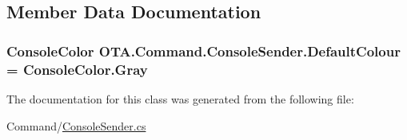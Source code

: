 \subsection{Member Data Documentation}
\hypertarget{class_o_t_a_1_1_command_1_1_console_sender_a959ea02675496cb1bc5e32d81ea5ba7b}{}
\subsubsection[{Default\+Colour}]{\setlength{\rightskip}{0pt plus 5cm}Console\+Color O\+T\+A.\+Command.\+Console\+Sender.\+Default\+Colour = Console\+Color.\+Gray\hspace{0.3cm}{\ttfamily [static]}}\label{class_o_t_a_1_1_command_1_1_console_sender_a959ea02675496cb1bc5e32d81ea5ba7b}


The documentation for this class was generated from the following file\+:\begin{DoxyCompactItemize}
\item 
Command/\hyperlink{_console_sender_8cs}{Console\+Sender.\+cs}\end{DoxyCompactItemize}
